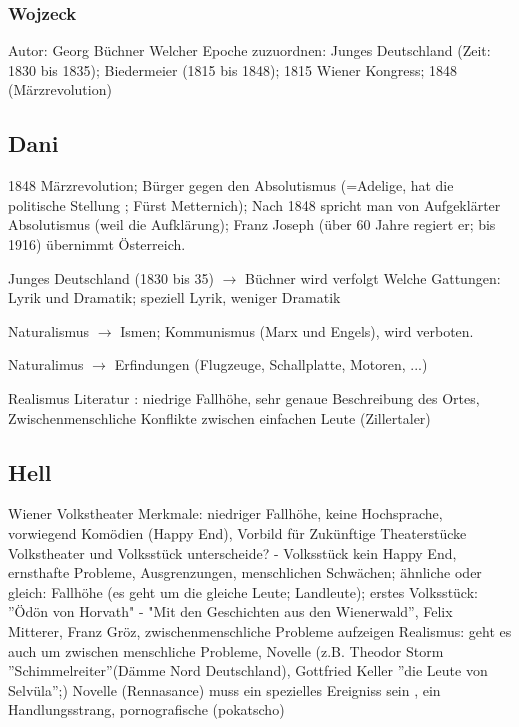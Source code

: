 \documentclass[a4paper]{article}
\begin{document}
\subsubsection{Wojzeck}

Autor: Georg Büchner 
Welcher Epoche zuzuordnen: Junges Deutschland (Zeit: 1830 bis 1835); Biedermeier (1815 bis 1848); 1815 Wiener Kongress; 1848 (Märzrevolution)


\subsection{Dani}

1848 Märzrevolution; Bürger gegen den Absolutismus (=Adelige, hat die politische Stellung ; Fürst Metternich); 
Nach 1848 spricht man von Aufgeklärter Absolutismus (weil die Aufklärung); Franz Joseph (über 60 Jahre regiert er; bis 1916) übernimmt Österreich.

Junges Deutschland (1830 bis 35) $\rightarrow$ Büchner wird verfolgt
Welche Gattungen: Lyrik und Dramatik; speziell Lyrik, weniger Dramatik

Naturalismus $\rightarrow$ Ismen; 
Kommunismus (Marx und Engels), wird verboten.

Naturalimus $\rightarrow$ Erfindungen (Flugzeuge, Schallplatte, Motoren, ...)

Realismus Literatur : niedrige Fallhöhe, sehr genaue Beschreibung des Ortes, Zwischenmenschliche Konflikte zwischen einfachen Leute (Zillertaler)

\subsection{Hell}

Wiener Volkstheater Merkmale: niedriger Fallhöhe, keine Hochsprache, vorwiegend Komödien (Happy End), Vorbild für Zukünftige Theaterstücke
Volkstheater und Volksstück unterscheide? - Volksstück kein Happy End, ernsthafte Probleme, Ausgrenzungen, menschlichen Schwächen; ähnliche oder gleich: Fallhöhe (es geht um die gleiche Leute; Landleute); erstes Volksstück: ''Ödön von Horvath" - "Mit den Geschichten aus den Wienerwald'', Felix Mitterer, Franz Gröz, zwischenmenschliche Probleme aufzeigen
\newline
Realismus: geht es auch um zwischen menschliche Probleme, Novelle (z.B. Theodor Storm ''Schimmelreiter''(Dämme Nord Deutschland), Gottfried Keller ''die Leute von Selvüla'';) 
\newline
Novelle (Rennasance)  muss ein spezielles Ereigniss sein , ein Handlungsstrang, pornografische (pokatscho)
\end{document}

